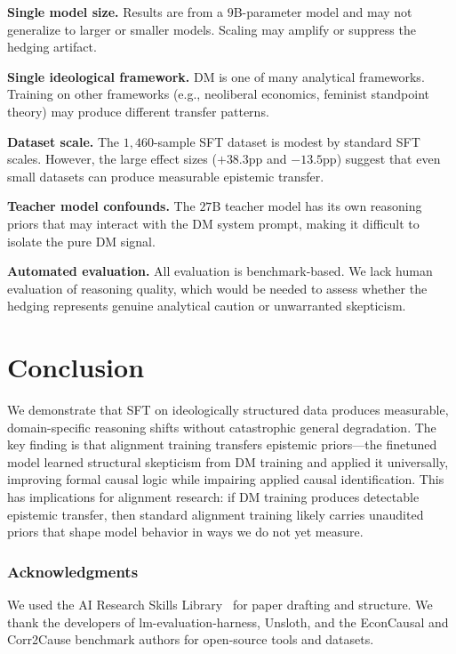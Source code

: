 \documentclass{article}
\begin{document}
\textbf{Single model size.} Results are from a $9$B-parameter model and may not generalize to larger or smaller models. Scaling may amplify or suppress the hedging artifact.

\textbf{Single ideological framework.} DM is one of many analytical frameworks. Training on other frameworks (e.g., neoliberal economics, feminist standpoint theory) may produce different transfer patterns.

\textbf{Dataset scale.} The $1{,}460$-sample SFT dataset is modest by standard SFT scales. However, the large effect sizes ($+38.3$pp and $-13.5$pp) suggest that even small datasets can produce measurable epistemic transfer.

\textbf{Teacher model confounds.} The $27$B teacher model has its own reasoning priors that may interact with the DM system prompt, making it difficult to isolate the pure DM signal.

\textbf{Automated evaluation.} All evaluation is benchmark-based. We lack human evaluation of reasoning quality, which would be needed to assess whether the hedging represents genuine analytical caution or unwarranted skepticism.

\section{Conclusion}

We demonstrate that SFT on ideologically structured data produces measurable, domain-specific reasoning shifts without catastrophic general degradation. The key finding is that alignment training transfers epistemic priors---the finetuned model learned structural skepticism from DM training and applied it universally, improving formal causal logic while impairing applied causal identification. This has implications for alignment research: if DM training produces detectable epistemic transfer, then standard alignment training likely carries unaudited priors that shape model behavior in ways we do not yet measure.

\subsubsection*{Acknowledgments}

We used the AI Research Skills Library~\cite{ai_research_skills} for paper drafting and structure. We thank the developers of lm-evaluation-harness, Unsloth, and the EconCausal and Corr2Cause benchmark authors for open-source tools and datasets.
\end{document}
